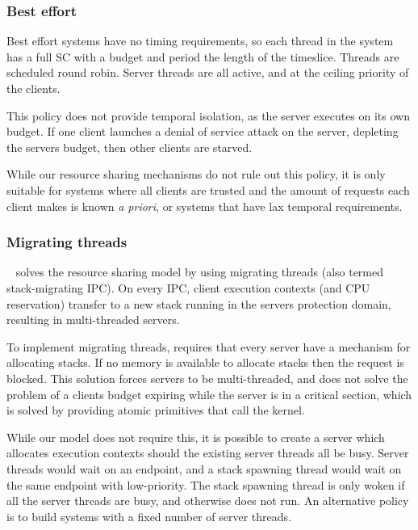 \subsubsection{Best effort}
\label{sec:best-effort}

Best effort systems have no timing requirements, so each thread in the system has a full \gls{SC}
with a budget and period the length of the timeslice. Threads are scheduled round robin. Server
threads are all active, and at the ceiling priority of the clients. 

This policy does not provide temporal isolation, as the server executes on its own budget.  If one
client launches a denial of service attack on the server, depleting the servers budget, then other
clients are starved. 

While our resource sharing mechanisms do not rule out this policy, it is only suitable for
systems where all clients are trusted and the amount of requests each client makes is known \emph{a
priori}, or systems that have lax temporal requirements.

\subsubsection{Migrating threads}

\composite~\citep{Parmer_10} solves the resource sharing model by using migrating threads (also termed stack-migrating IPC).
On every IPC, client execution contexts (and CPU reservation) transfer to a new stack running in the servers protection domain, resulting in multi-threaded servers.

To implement migrating threads, \composite requires that every server have a mechanism for allocating stacks.
If no memory is available to allocate stacks then the request is blocked.
This solution forces servers to be multi-threaded, and does not solve the problem of a clients budget expiring while the server is in a critical section, which is solved by providing atomic primitives that call the kernel.

While our model does not require this, it is possible to create a server which allocates execution
contexts should the existing server threads all be busy. Server threads would wait on an endpoint,
and a stack spawning thread would wait on the same endpoint with low-priority. The stack spawning
thread is only woken if all the server threads are busy, and otherwise does not run. An
alternative policy is to build systems with a fixed number of server threads. 

